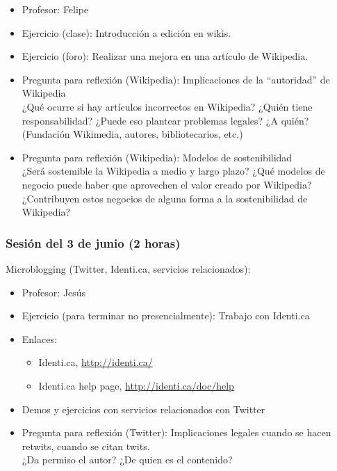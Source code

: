 \documentclass[a4paper,12pt]{article}
\begin{document}
\begin{itemize}
\item Profesor: Felipe
\item Ejercicio (clase): Introducción a edición en wikis.
\item Ejercicio (foro): Realizar una mejora en una artículo de Wikipedia.
\item Pregunta para reflexión (Wikipedia): Implicaciones de la ``autoridad'' de Wikipedia \\
  ¿Qué ocurre si hay artículos incorrectos en Wikipedia? ¿Quién tiene responsabilidad? ¿Puede eso plantear problemas legales? ¿A quién? (Fundación Wikimedia, autores, bibliotecarios, etc.)
\item Pregunta para reflexión (Wikipedia): Modelos de sostenibilidad \\
  ¿Será sostemible la Wikipedia a medio y largo plazo? ¿Qué modelos de negocio puede haber que aprovechen el valor creado por Wikipedia? ¿Contribuyen estos negocios de alguna forma a la sostenibilidad de Wikipedia?
\end{itemize}

\subsubsection{Sesión del 3 de junio (2 horas)}

Microblogging (Twitter, Identi.ca, servicios relacionados):

\begin{itemize}
\item Profesor: Jesús
\item Ejercicio (para terminar no presencialmente): Trabajo con Identi.ca
\item Enlaces:
  \begin{itemize}
  \item Identi.ca, \url{http://identi.ca/}
  \item Identi.ca help page, \url{http://identi.ca/doc/help}
  \end{itemize}
\item Demos y ejercicios con servicios relacionados con Twitter
\item Pregunta para reflexión (Twitter): Implicaciones legales cuando se hacen retwits, cuando se citan twits. \\
  ¿Da permiso el autor? ¿De quien es el contenido?
\end{itemize}

\end{document}
